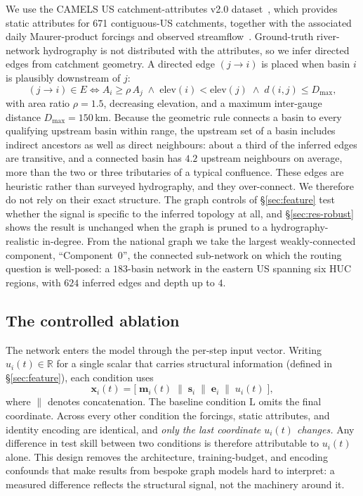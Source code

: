 \documentclass[11pt]{article}
\begin{document}
We use the CAMELS US catchment-attributes v2.0 dataset~\cite{addor2017}, which provides static
attributes for 671 contiguous-US catchments, together with the associated daily Maurer-product
forcings and observed streamflow~\cite{newman2015,newman2014data}. Ground-truth river-network
hydrography is not distributed with the attributes, so we infer directed edges from catchment
geometry. A directed edge $(j\!\to\!i)$ is placed when basin $i$ is plausibly downstream of $j$:
\begin{equation}
\label{eq:edge}
(j\!\to\!i)\in E \iff A_i \ge \rho\,A_j \;\wedge\; \mathrm{elev}(i) < \mathrm{elev}(j) \;\wedge\; d(i,j)\le D_{\max},
\end{equation}
with area ratio $\rho=1.5$, decreasing elevation, and a maximum inter-gauge distance
$D_{\max}=150$\,km. Because the geometric rule connects a basin to every qualifying upstream basin
within range, the upstream set of a basin includes indirect ancestors as well as direct neighbours:
about a third of the inferred edges are transitive, and a connected basin has $4.2$ upstream
neighbours on average, more than the two or three tributaries of a typical confluence. These edges are heuristic rather than surveyed
hydrography, and they over-connect. We therefore do not rely on their exact structure. The graph
controls of \S\ref{sec:feature} test whether the signal is specific to the inferred topology at all,
and \S\ref{sec:res-robust} shows the result is unchanged when the graph is pruned to a
hydrography-realistic in-degree. From the national graph we take the largest weakly-connected
component, ``Component~0'', the connected sub-network on which the routing question is well-posed: a
$183$-basin network in the eastern US spanning six HUC regions, with $624$ inferred edges and depth
up to $4$.

\subsection{The controlled ablation}
\label{sec:ablation}

The network enters the model through the per-step input vector. Writing $u_i(t)\in\mathbb{R}$ for a
single scalar that carries structural information (defined in \S\ref{sec:feature}), each condition
uses
\begin{equation}
\label{eq:input}
\mathbf{x}_i(t) = \big[\;\mathbf{m}_i(t)\;\|\;\mathbf{s}_i\;\|\;\mathbf{e}_i\;\|\;u_i(t)\;\big],
\end{equation}
where $\|$ denotes concatenation. The baseline condition $\mathrm{L}$ omits the final coordinate.
Across every other condition the forcings, static attributes, and identity encoding are identical,
and \emph{only the last coordinate $u_i(t)$ changes.} Any difference in test skill between two
conditions is therefore attributable to $u_i(t)$ alone. This design removes the architecture,
training-budget, and encoding confounds that make results from bespoke graph models hard to
interpret: a measured difference reflects the structural signal, not the machinery around it.
\end{document}

